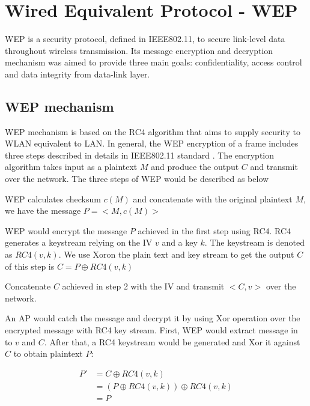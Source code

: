 \section{Wired Equivalent Protocol - WEP}


\ac{WEP} is a security protocol, defined in \ac{IEEE}802.11, to secure link-level data throughout wireless transmission. Its message encryption and decryption mechanism was aimed to provide three main goals: confidentiality, access control and data integrity from data-link layer.
\subsection{WEP mechanism}\label{subsec:wep_mec}
\ac{WEP} mechanism is based on the \ac{RC4} algorithm\cite{mousa2006evaluation} that aims to supply security to \ac{WLAN} equivalent to \ac{LAN}. In general, the \ac{WEP} encryption of a frame includes three steps described in details in \ac{IEEE}802.11 standard \cite{al2006ieee}. The encryption algorithm takes input as a plaintext $M$ and produce the output $C$ and transmit over the network. The three steps of \ac{WEP} would be described as below
\begin{steps}
	\item \ac{WEP} calculates checksum $c(M)$ and concatenate with the original plaintext $M$, we have the message $P = <M, c(M)>$
	\item \ac{WEP} would encrypt the message $P$ achieved in the first step using \ac{RC4}. \ac{RC4} generates a keystream relying on the \ac{IV} $v$ and a key $k$. The keystream is denoted as $RC4(v,k)$. We use \ac{Xor}on the plain text and key stream to get the output $C$ of this step is $C = P \oplus RC4(v,k)$
	\item Concatenate $C$ achieved in step 2 with the \ac{IV} and transmit $<C, v>$ over the network.
\end{steps}

An \ac{AP} would catch the message and decrypt it by using \ac{Xor} operation over the encrypted message with \ac{RC4} key stream.  First, \ac{WEP} would extract message in to $v$ and $C$. After that, a \ac{RC4} keystream would be generated and \ac{Xor} it against $C$ to obtain plaintext $P$:
\begin{center}
	\begin{align}
	P'&= C \oplus RC4(v, k) \\
	&= (P \oplus RC4(v, k)) \oplus RC4(v, k) \\
	&= P
	\end{align}
\end{center}


